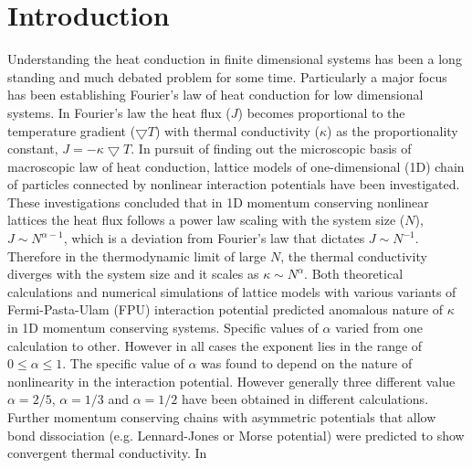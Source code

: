 \documentclass[aps,pre,reprint,groupedaddress]{revtex4-1}
\begin{document}
\pacs{}

\maketitle

\section{Introduction}\label{intro}

Understanding the heat conduction in finite dimensional systems has been a long standing and much debated problem for some time. Particularly a major focus has been establishing Fourier's law of heat conduction for low dimensional systems. In Fourier's law the heat flux ($J$) becomes proportional to the temperature gradient ($\bigtriangledown T$) with thermal conductivity ($\kappa$) as the proportionality constant, $J=-\kappa \bigtriangledown T$. In pursuit of finding out the microscopic basis of macroscopic law of heat conduction, lattice models of one-dimensional (1D) chain of particles connected by nonlinear interaction potentials have been investigated\cite{Lepri2003a,Dhar2008}. These investigations concluded that in 1D momentum conserving nonlinear lattices the heat flux follows a power law scaling with the system size ($N$), $J \sim N^{\alpha-1}$\cite{Lepri1997}, which is a deviation from Fourier's law that dictates $J \sim N^{-1}$. Therefore in the thermodynamic limit of large $N$, the thermal conductivity diverges with the system size and it scales as $\kappa \sim N^\alpha$. Both theoretical calculations \cite{Lepri1998,Prosen2000,Narayan2002,Lepri2003a,Wang2004a,Lee-Dadswell2005,Li2006a,Delfini2006,Mai2006,VanBeijeren2012,Mendl2013,Spohn2014,Lee-Dadswell2015} and numerical simulations \cite{Lepri1997,Lepri1998,Hu2000,Wang2004a,Li2005,Mai2007,Dhar2008,Roy2012a,Li2015} of lattice models with various variants of Fermi-Pasta-Ulam (FPU) interaction potential predicted anomalous nature of $\kappa$ in 1D momentum conserving systems. Specific values of $\alpha$ varied from one calculation to other\cite{Dhar2008}. However in all cases the exponent lies in the range of $0\le\alpha\le1$. The specific value of $\alpha$ was found to depend on the nature of nonlinearity in the interaction potential. However generally three different value $\alpha=2/5$\cite{Lepri1998,Lepri2003}, $\alpha=1/3$ \cite{Narayan2002,Wang2004a,Mai2006,Mai2007,Roy2012a} and $\alpha=1/2$ \cite{Lee-Dadswell2005,Delfini2006,VanBeijeren2012,Mendl2013} have been obtained in different calculations. Further momentum conserving chains with asymmetric potentials that allow bond dissociation (e.g. Lennard-Jones or Morse potential) were predicted to show convergent thermal conductivity\cite{Savin2014,Sato2016}. In    
\end{document}
